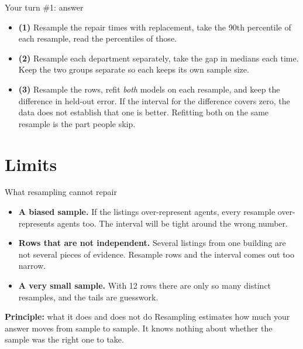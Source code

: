\documentclass[aspectratio=169]{beamer}
\newenvironment{principle}[1]{\begin{block}{\textbf{Principle:} #1}}{\end{block}}
\begin{document}
\begin{frame}{Your turn \#1: answer}
\begin{itemize}\small
  \item \textbf{(1)} Resample the repair times with replacement, take the 90th percentile of each
        resample, read the percentiles of those.
  \item \textbf{(2)} Resample each department separately, take the gap in medians each time. Keep
        the two groups separate so each keeps its own sample size.
  \item \textbf{(3)} Resample the rows, refit \emph{both} models on each resample, and keep the
        difference in held-out error. If the interval for the difference covers zero, the data
        does not establish that one is better. Refitting both on the same resample is the part
        people skip.
\end{itemize}
\end{frame}

\section{Limits}
\begin{frame}{What resampling cannot repair}
\begin{itemize}
  \item \textbf{A biased sample.} If the listings over-represent agents, every resample
        over-represents agents too. The interval will be tight around the wrong number.
  \item \textbf{Rows that are not independent.} Several listings from one building are not several
        pieces of evidence. Resample rows and the interval comes out too narrow.
  \item \textbf{A very small sample.} With 12 rows there are only so many distinct resamples, and
        the tails are guesswork.
\end{itemize}
\begin{principle}{what it does and does not do}
Resampling estimates how much your answer moves from sample to sample. It knows nothing about
whether the sample was the right one to take.
\end{principle}
\end{frame}
\end{document}
